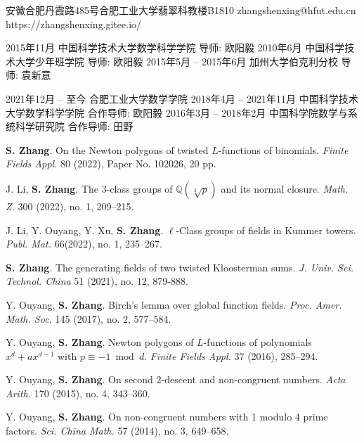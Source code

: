 \documentclass[11pt]{article}
\begin{document}
	{安徽合肥丹霞路485号合肥工业大学翡翠科教楼B1810}
	{zhangshenxing@hfut.edu.cn}
	{https://zhangshenxing.gitee.io/}


\begin{cvstage}
		{2015年11月}
		{中国科学技术大学数学科学学院}
		{导师: 欧阳毅}
		{2010年6月}
		{中国科学技术大学少年班学院}
		{导师: 欧阳毅}
		{2015年5月 -- 2015年6月}
		{加州大学伯克利分校}
		{导师: 袁新意}
\end{cvstage}


\begin{cvstage}
		{2021年12月 -- 至今}
		{合肥工业大学数学学院}
		{}
		{2018年4月 -- 2021年11月}
		{中国科学技术大学数学科学学院}
		{合作导师: 欧阳毅}
		{2016年3月 -- 2018年2月}
		{中国科学院数学与系统科学研究院}
		{合作导师: 田野}
\end{cvstage}

\begin{cvlist}
	\item \textbf{S. Zhang}.
	On the Newton polygons of twisted $L$-functions of binomials.
	{\em Finite Fields Appl.} 80 (2022), Paper No. 102026, 20 pp.

	\item J. Li, \textbf{S. Zhang}.
	The $3$-class groups of $\mathbb{Q}(\sqrt[3]{p})$ and its normal closure.
	{\em Math. Z.} 300 (2022), no. 1, 209--215.

	\item J. Li, Y. Ouyang, Y. Xu, \textbf{S. Zhang}.
	$\ell$-Class groups of fields in Kummer towers.
	{\em Publ. Mat.} 66(2022), no. 1, 235--267.

	\item \textbf{S. Zhang}.
	The generating fields of two twisted Kloosterman sums.
	{\em J. Univ. Sci. Technol. China} 51 (2021), no. 12, 879-888.

	\item Y. Ouyang, \textbf{S. Zhang}.
	Birch's lemma over global function fields.
	{\em Proc. Amer. Math. Soc.} 145 (2017), no. 2, 577--584.

	\item Y. Ouyang, \textbf{S. Zhang}.
	Newton polygons of $L$-functions of polynomials $x^d+ax^{d-1}$ with $p\equiv -1 \bmod d$.
	{\em Finite Fields Appl.} 37 (2016), 285--294.

	\item Y. Ouyang, \textbf{S. Zhang}.
	On second 2-descent and non-congruent numbers.
	{\em Acta Arith.} 170 (2015), no. 4, 343--360.

	\item Y. Ouyang, \textbf{S. Zhang}.
	On non-congruent numbers with 1 modulo 4 prime factors.
	{\em Sci. China Math.} 57 (2014), no. 3, 649--658.
	\end{cvlist}
\end{document}

